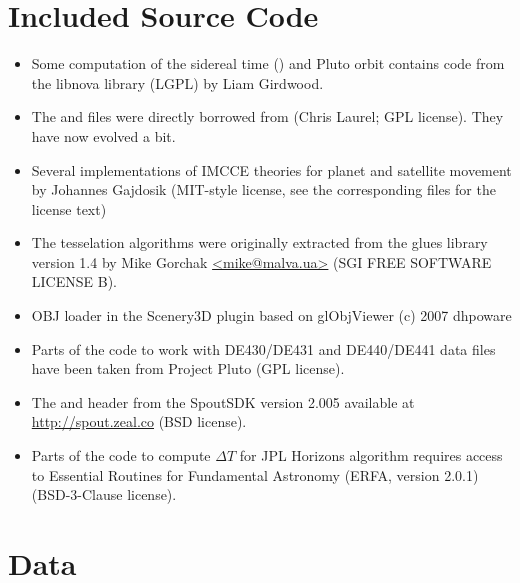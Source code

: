 \section{Included Source Code}
\label{sec:ack:code}

\begin{itemize}		
  \item Some computation of the sidereal time () and Pluto
      orbit contains code from the libnova library (LGPL) by Liam Girdwood.
  \item The  and  files were directly borrowed from
       (Chris Laurel; GPL license). They have now evolved a bit.
  \item Several implementations of IMCCE theories for planet and satellite movement by Johannes Gajdosik 
       (MIT-style license, see the corresponding files for the license text)
  \item The tesselation algorithms were originally extracted from the glues 
      library version 1.4 by Mike Gorchak \url{<mike@malva.ua>} (SGI FREE SOFTWARE LICENSE B).
  \item OBJ loader in the Scenery3D plugin based on glObjViewer (c) 2007 dhpoware
  \item Parts of the code to work with DE430/DE431 and DE440/DE441 data files have been taken from Project Pluto (GPL license).
  \item The  and header from the SpoutSDK version 2.005 available at \url{http://spout.zeal.co} (BSD license).
  \item Parts of the code to compute $\Delta T$ for JPL Horizons algorithm requires access to Essential Routines for Fundamental Astronomy (ERFA, version 2.0.1) (BSD-3-Clause license).
\end{itemize}

\section{Data}
\label{sec:ack:data}

